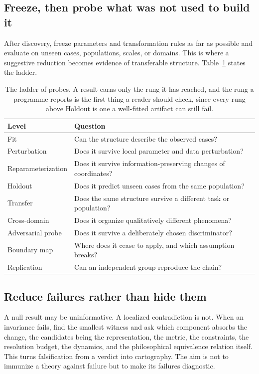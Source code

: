 \documentclass[11pt]{article}
\theoremstyle{remark}
\begin{document}
\subsection{Freeze, then probe what was not used to build it}

After discovery, freeze parameters and transformation rules as far as possible and
evaluate on unseen cases, populations, scales, or domains. This is where a
suggestive reduction becomes evidence of transferable structure.
Table~\ref{tab:ladder} states the ladder.

\begin{table}[t]
\centering
\small
\begin{tabular}{@{}ll@{}}
\toprule
Level & Question \\
\midrule
Fit & Can the structure describe the observed cases? \\
Perturbation & Does it survive local parameter and data perturbation? \\
Reparameterization & Does it survive information-preserving changes of coordinates? \\
Holdout & Does it predict unseen cases from the same population? \\
Transfer & Does the same structure survive a different task or population? \\
Cross-domain & Does it organize qualitatively different phenomena? \\
Adversarial probe & Does it survive a deliberately chosen discriminator? \\
Boundary map & Where does it cease to apply, and which assumption breaks? \\
Replication & Can an independent group reproduce the chain? \\
\bottomrule
\end{tabular}
\caption{The ladder of probes. A result earns only the rung it has reached, and the
rung a programme reports is the first thing a reader should check, since every rung
above Holdout is one a well-fitted artifact can still fail.}
\label{tab:ladder}
\end{table}

\subsection{Reduce failures rather than hide them}

A null result may be uninformative. A localized contradiction is not. When an
invariance fails, find the smallest witness and ask which component absorbs the
change, the candidates being the representation, the metric, the constraints, the
resolution budget, the dynamics, and the philosophical equivalence relation itself.
This turns falsification from a verdict into cartography. The aim is not to
immunize a theory against failure but to make its failures diagnostic.
\end{document}
